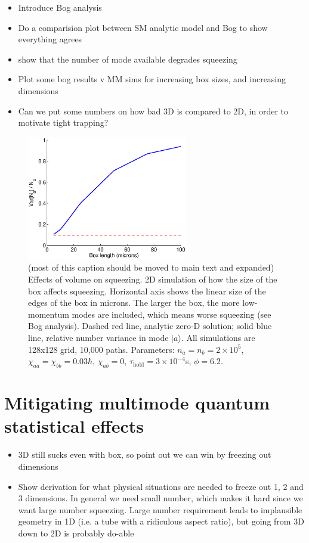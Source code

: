 \documentclass{iopart}
\begin{document}
  \begin{itemize}
  \item Introduce Bog analysis
  \item Do a comparision plot between SM analytic model and Bog to show everything agrees
  \item show that the number of mode available degrades squeezing
  \item Plot some bog results v MM sims for increasing box sizes, and increasing dimensions
  \item Can we put some numbers on how bad 3D is compared to 2D, in order to motivate tight trapping?
  \end{itemize}



\begin{figure}
  \centering
   \includegraphics[width=7cm]{figures/volume_effect_on_squeezing.eps}
\caption{(most of this caption should be moved to main text and expanded) Effects of volume on squeezing. 2D simulation of how the size of the box affects squeezing. Horizontal axis shows the linear size of the edges of the box in microns. The larger the box, the more low-momentum modes are included, which means worse squeezing (see Bog analysis). Dashed red line, analytic zero-D solution; solid blue line, relative number variance in mode $|a\rangle$. All simulations are 128x128 grid, 10,000 paths. Parameters: $n_a = n_b =2 \times 10^5$, $\chi_{aa}=\chi_{bb}=0.03\hbar$, $\chi_{ab}=0$, $\tau_{\mathrm{hold}}=3\times 10^{-4}$s, $\phi=6.2$.}
 \label{figVolumeSqueezingEffects}
\end{figure}


\section{Mitigating multimode quantum statistical effects}
  \begin{itemize}
  \item 3D still sucks even with box, so point out we can win by freezing out dimensions
  \item Show derivation for what physical situations are needed to freeze out 1, 2 and 3 dimensions. In general we need small number, which makes it hard since we want large number squeezing. Large number requirement leads to implausible geometry in 1D (i.e. a tube with a ridiculous aspect ratio), but going from 3D down to 2D is probably do-able
  \end{itemize}
\end{document}
